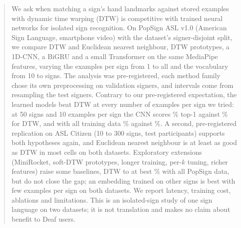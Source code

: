 \begin{abstract}
We ask when matching a sign's hand landmarks against stored examples with dynamic time warping (DTW) is competitive with trained
neural networks for isolated sign recognition. On PopSign ASL v1.0 (American Sign Language, smartphone video) with the dataset's
signer-disjoint split, we compare DTW and Euclidean nearest neighbour, DTW prototypes, a 1D-CNN, a BiGRU and a small Transformer on the
same MediaPipe features, varying the examples per sign from 1 to all and the vocabulary from 10 to \nVocabMax{} signs.
The analysis was pre-registered, each method family chose its own preprocessing on validation signers, and intervals come from
resampling the \nTestSigners{} test signers. Contrary to our pre-registered expectation, the learned models beat DTW at every number of
examples per sign we tried: at 50 signs and 10 examples per sign the CNN scores \accCnnVFiftyKTen\% top-1 against \accDtwVFiftyKTen\% for DTW,
and with all training data \accTransVFiftyKAll\% against \accDtwVFiftyKAll\%. A second, pre-registered replication on ASL Citizen
(10 to 300 signs, \cznSignersTest{} test participants) supports both hypotheses again, and Euclidean nearest neighbour is at least as good as DTW in most cells
on both datasets. Exploratory extensions (MiniRocket, soft-DTW prototypes, longer training, per-$k$ tuning, richer features) raise some baselines, DTW to at best
\ablBestDtwKAll\% with all PopSign data, but do not close the gap; an embedding trained on other signs is best with few examples per sign on both datasets. We report latency, training cost, ablations and limitations. This is an isolated-sign
study of one sign language on two datasets; it is not translation and makes no claim about benefit to Deaf users.
\end{abstract}
